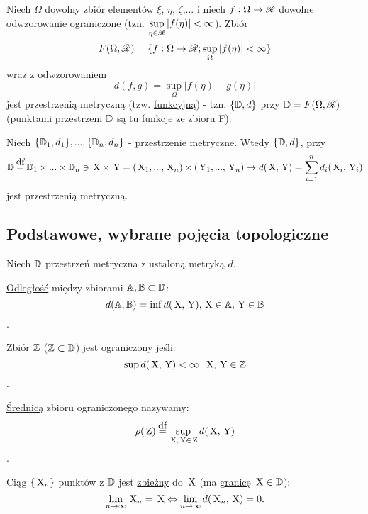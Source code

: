 \begin{example}
    Niech $\Omega$ dowolny zbiór elementów $\xi$, $\eta$, $\zeta$,... i niech $f:\Omega \to \mathscr{R}$ dowolne odwzorowanie ograniczone (tzn. $\sup\limits_{\eta \in \mathscr{R}}|f(\eta)| < \infty$). Zbiór \[F(\Omega, \mathscr{R})=\{f:\Omega\to\mathscr{R}; \sup\limits_\Omega|f(\eta)|<\infty\}\]
    wraz z odwzorowaniem
    \[d(f,g) = \sup_\Omega|f(\eta)-g(\eta)|\]
    jest przestrzenią metryczną (tzw. \underline{funkcyjną}) - tzn. $\{\mathbb{D}, d\}$ przy $\mathbb{D} = F(\Omega, \mathscr{R})$ (punktami przestrzeni $\mathbb{D}$ są tu funkcje ze zbioru F). 
\end{example}

\begin{example}
    Niech $\{\mathbb{D}_1, d_1\}, ..., \{\mathbb{D}_n, d_n\}$ - przestrzenie metryczne. Wtedy $\{\mathbb{D}, d\}$, przy
    \[\mat{D} \df \mat{D}_1 \times ... \times \mat{D}_n \ni \p{X} \times \p{Y} = (\p{X}_1, ..., \p{X}_n) \times (\p{Y}_1, ..., \p{Y}_n) \to d(\p{X}, \p{Y}) = \sum^n_{i=1} d_i(\p{X}_i, \p{Y}_i)\]
    jest przestrzenią metryczną.
\end{example}

\subsection{Podstawowe, wybrane pojęcia topologiczne}

    Niech $\mathbb{D}$ przestrzeń metryczna z ustaloną metryką $d$.
    
\begin{mydef}
    \underline{Odległość} między zbiorami $\mathbb{A}, \mathbb{B} \subset \mathbb{D}$:
    \[d(\mathbb{A}, \mathbb{B}) = \inf d(\,\textnormal{X},\,\textnormal{Y}), \,\textnormal{X} \in \mathbb{A}, \,\textnormal{Y} \in \mathbb{B}\].
\end{mydef}

\begin{mydef}
    Zbiór $\mathbb{Z}$ ($\mathbb{Z}\subset \mathbb{D}$) jest \underline{ograniczony} jeśli:
    \[\sup d(\,\textnormal{X},\,\textnormal{Y}) < \infty \;\; \,\textnormal{X},\,\textnormal{Y}\in\mathbb{Z}\].
\end{mydef}

\begin{mydef}
    \underline{Średnicą} zbioru ograniczonego nazywamy:
    \[\rho (\mat{\p{Z}}) \df \sup\limits_{\p{X},\p{Y} \in \mat{\p{Z}}} d(\p{X},\p{Y})\].
\end{mydef}

\begin{mydef}
    Ciąg $\{\,\textnormal{X}_n\}$ punktów z $\mathbb{D}$ jest \underline{zbieżny} do $\,\textnormal{X}$ (ma \underline{granicę} $\,\textnormal{X} \in \mathbb{D}$):
    \[ \lim_{n \to \infty} \,\textnormal{X}_n = \,\textnormal{X} \Leftrightarrow \lim_{n\to \infty} d(\,\textnormal{X}_n, \,\textnormal{X}) = 0.\]
\end{mydef}

